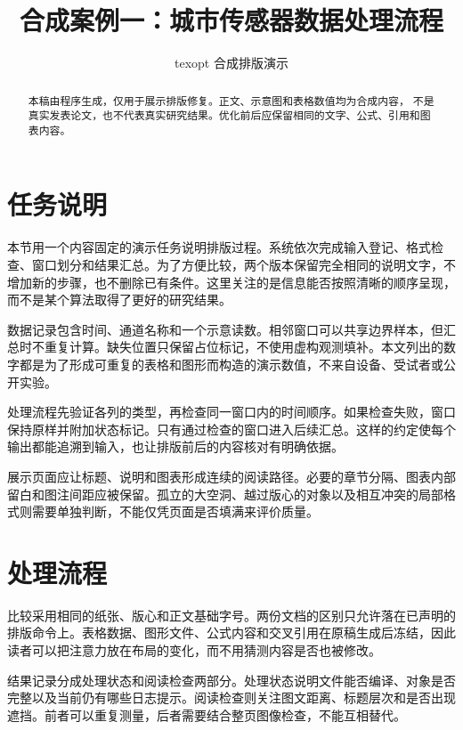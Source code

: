 \documentclass[UTF8,10pt,a4paper,fontset=windows]{ctexart}
\title{\Huge 合成案例一：城市传感器数据处理流程}
\author{texopt 合成排版演示}
\date{}
\begin{document}
\maketitle
\begin{abstract}
本稿由程序生成，仅用于展示排版修复。正文、示意图和表格数值均为合成内容，
不是真实发表论文，也不代表真实研究结果。优化前后应保留相同的文字、公式、引用和图表内容。
\end{abstract}
\section{任务说明}
本节用一个内容固定的演示任务说明排版过程。系统依次完成输入登记、格式检查、窗口划分和结果汇总。为了方便比较，两个版本保留完全相同的说明文字，不增加新的步骤，也不删除已有条件。这里关注的是信息能否按照清晰的顺序呈现，而不是某个算法取得了更好的研究结果。

数据记录包含时间、通道名称和一个示意读数。相邻窗口可以共享边界样本，但汇总时不重复计算。缺失位置只保留占位标记，不使用虚构观测填补。本文列出的数字都是为了形成可重复的表格和图形而构造的演示数值，不来自设备、受试者或公开实验。

\newpage

处理流程先验证各列的类型，再检查同一窗口内的时间顺序。如果检查失败，窗口保持原样并附加状态标记。只有通过检查的窗口进入后续汇总。这样的约定使每个输出都能追溯到输入，也让排版前后的内容核对有明确依据。

\vspace{30mm}

展示页面应让标题、说明和图表形成连续的阅读路径。必要的章节分隔、图表内部留白和图注间距应被保留。孤立的大空洞、越过版心的对象以及相互冲突的局部格式则需要单独判断，不能仅凭页面是否填满来评价质量。

\section{处理流程}
{\Large 比较采用相同的纸张、版心和正文基础字号。两份文档的区别只允许落在已声明的排版命令上。表格数据、图形文件、公式内容和交叉引用在原稿生成后冻结，因此读者可以把注意力放在布局的变化，而不用猜测内容是否也被修改。}

结果记录分成处理状态和阅读检查两部分。处理状态说明文件能否编译、对象是否完整以及当前仍有哪些日志提示。阅读检查则关注图文距离、标题层次和是否出现遮挡。前者可以重复测量，后者需要结合整页图像检查，不能互相替代。

\vspace{26mm}
\end{document}
